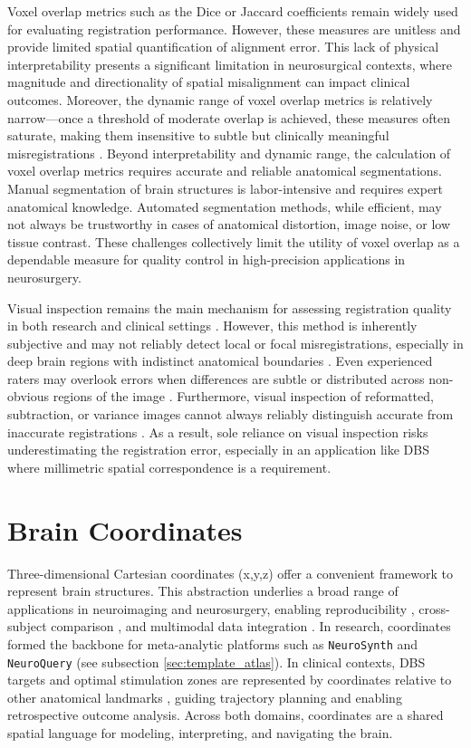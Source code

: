 Voxel overlap metrics such as the Dice or Jaccard coefficients remain widely used for evaluating registration performance. However, these measures are unitless and provide limited spatial quantification of alignment error. This lack of physical interpretability presents a significant limitation in neurosurgical contexts, where magnitude and directionality of spatial misalignment can impact clinical outcomes. Moreover, the dynamic range of voxel overlap metrics is relatively narrow—once a threshold of moderate overlap is achieved, these measures often saturate, making them insensitive to subtle but clinically meaningful misregistrations \cite{Lau2019-eh}. Beyond interpretability and dynamic range, the calculation of voxel overlap metrics requires accurate and reliable anatomical segmentations. Manual segmentation of brain structures is labor-intensive and requires expert anatomical knowledge. Automated segmentation methods, while efficient, may not always be trustworthy in cases of anatomical distortion, image noise, or low tissue contrast. These challenges collectively limit the utility of voxel overlap as a dependable measure for quality control in high-precision applications in neurosurgery.

Visual inspection remains the main mechanism for assessing registration quality in both research and clinical settings \cite{Neudorfer2023-wd,Esteban2019-oz}. However, this method is inherently subjective and may not reliably detect local or focal misregistrations, especially in deep brain regions with indistinct anatomical boundaries \cite{Bosma2024-cf,Rohlfing2012-kt}. Even experienced raters may overlook errors when differences are subtle or distributed across non-obvious regions of the image \cite{de-Senneville2020-am}. Furthermore, visual inspection of reformatted, subtraction, or variance images cannot always reliably distinguish accurate from inaccurate registrations \cite{Rohlfing2012-kt}. As a result, sole reliance on visual inspection risks underestimating the registration error, especially in an application like DBS where millimetric spatial correspondence is a requirement.

\section{Brain Coordinates} 
Three-dimensional Cartesian coordinates (x,y,z) offer a convenient framework to represent brain structures. This abstraction underlies a broad range of applications in neuroimaging and neurosurgery, enabling reproducibility \cite{Dockes2020-nw}, cross-subject comparison \cite{Glasser2016-ko}, and multimodal data integration \cite{Uludag2014-qz}. In research, coordinates formed the backbone for meta-analytic platforms such as \texttt{NeuroSynth} and \texttt{NeuroQuery} (see subsection \ref{sec:template_atlas}). In clinical contexts, DBS targets and optimal stimulation zones are represented by coordinates relative to other anatomical landmarks \cite{Horn2017-bi}, guiding trajectory planning and enabling retrospective outcome analysis. Across both domains, coordinates are a shared spatial language for modeling, interpreting, and navigating the brain.

